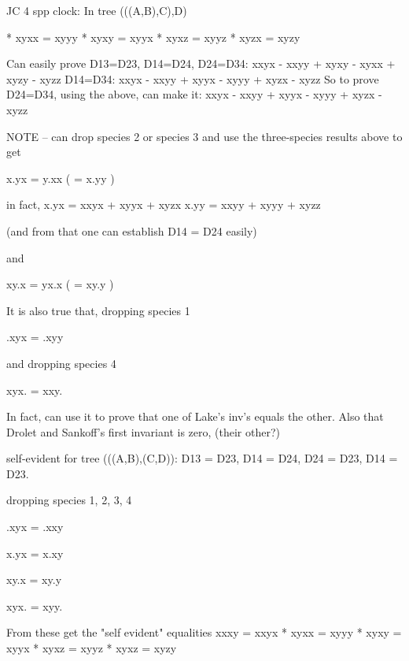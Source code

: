 JC 4 spp clock:
In tree (((A,B),C),D)

*  xyxx = xyyy
*  xyxy = xyyx
*  xyxz = xyyz
*  xyzx = xyzy

Can easily prove D13=D23, D14=D24,
D24=D34:  xxyx - xxyy + xyxy - xyxx + xyzy - xyzz
D14=D34:  xxyx - xxyy + xyyx - xyyy + xyzx - xyzz   
So to prove D24=D34, using the above, can make it:
    xxyx - xxyy + xyyx - xyyy + xyzx - xyzz

NOTE -- can drop species 2 or species 3 and use the three-species
results above to get

x.yx = y.xx   ( = x.yy )

in fact,
x.yx =  xxyx + xyyx + xyzx
x.yy =  xxyy + xyyy + xyzz

(and from that one can establish  D14 = D24 easily)


and

xy.x = yx.x   ( = xy.y )

It is also true that, dropping species 1

.xyx = .xyy

and dropping species 4

xyx. = xxy.

In fact, can use it to prove that one of Lake's inv's equals the other.
Also that Drolet and Sankoff's first invariant is zero, (their other?)


self-evident for tree (((A,B),(C,D)):
D13 = D23,  D14 = D24, D24 = D23, D14 = D23.


dropping species 1, 2, 3, 4

.xyx = .xxy

x.yx = x.xy

xy.x = xy.y

xyx. = xyy.

From these get the "self evident" equalities
   xxxy = xxyx
*  xyxx = xyyy
*  xyxy = xyyx
*  xyxz = xyyz
*  xyxz = xyzy

